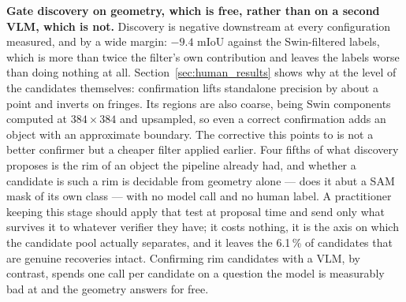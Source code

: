 \documentclass[conference]{IEEEtran}
\begin{document}
\textbf{Gate discovery on geometry, which is free, rather than on a second VLM, which is not.}
Discovery is negative downstream at every configuration measured, and by a wide margin: $-9.4$ mIoU
against the Swin-filtered labels, which is more than twice the filter's own contribution and leaves
the labels worse than doing nothing at all. Section~\ref{sec:human_results} shows why at the level of
the candidates themselves: confirmation lifts
standalone precision by about a point and inverts on fringes. Its regions are also coarse,
being Swin components computed at $384{\times}384$ and upsampled, so even a correct confirmation adds
an object with an approximate boundary.
The corrective this points to is not a better confirmer but a cheaper filter applied earlier.
Four fifths of what discovery proposes is the rim of an object the pipeline already had, and whether a
candidate is such a rim is decidable from geometry alone --- does it abut a SAM mask of its own class
--- with no model call and no human label. A practitioner keeping this stage should apply that test at
proposal time and send only what survives it to whatever verifier they have; it costs nothing, it is
the axis on which the candidate pool actually separates, and it leaves the 6.1\,\% of candidates that
are genuine recoveries intact. Confirming rim candidates with a VLM, by contrast, spends one call per
candidate on a question the model is measurably bad at and the geometry answers for free.
\end{document}
